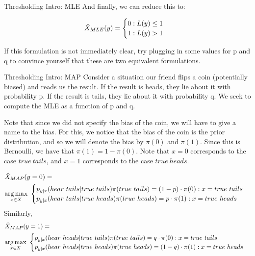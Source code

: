 \begin{exmp}{Thresholding Intro: MLE}{}
And finally, we can reduce this to:

\begin{align*}
  {\hat{X}_{MLE}} (y) =
  \begin{cases}
	0 : L(y) \leq 1 \\
	1 : L(y) > 1
	\end{cases} 
\end{align*}

If this formulation is not immediately clear, try plugging in some values for p and q to convince yourself that these are two equivalent formulations.

\end{exmp}


\begin{exmp}{Thresholding Intro: MAP}{}
Consider a situation our friend flips a coin (potentially biased) and reads us the result. If the result is heads, they lie about it with probability p. If the result is tails, they lie about it with probability q. We seek to compute the MLE as a function of p and q. \newline 

Note that since we did not specify the bias of the coin, we will have to give a name to the bias. For this, we notice that the bias of the coin is the prior distribution, and so we will denote the bias by \(\pi(0)\) and \(\pi(1)\). Since this is Bernoulli, we have that \(\pi(1) = 1- \pi(0)\). Note that \(x = 0\) corresponds to the case \(true \ tails\), and \(x = 1\) corresponds to the case \(true \ heads\).


\begin{align*}
  &\MAP (y=0) = \\
  &\underset{x\in X}{\argmax}\ 
\begin{cases}
	p_{y|x}(hear\ tails|true\ tails)\pi(true\ tails) = (1-p) \cdot \pi(0) : x=true \ tails \\
	p_{y|x}(hear\ tails|true\ heads)\pi(true\ heads) = p \cdot \pi(1) : x=true\ heads
\end{cases} 
\end{align*}
Similarly,
\begin{align*}
  &\MAP (y=1) = \\
  &\underset{x\in X}{\argmax}\ 
\begin{cases}
	p_{y|x}(hear\ heads|true\ tails)\pi(true\ tails) = q \cdot\pi(0):x=true \ tails \\
	p_{y|x}(hear\ heads|true\ heads)\pi(true\ heads) = (1-q)\cdot\pi(1) :x=true\ heads
\end{cases} 
\end{align*}


\end{exmp}
